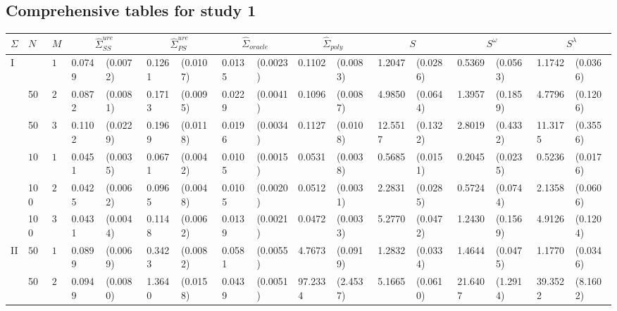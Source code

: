 \subsection{Comprehensive tables for study 1}
\begin{landscape}
%
\begin{table}[H]
\centering
\begin{footnotesize}
\begin{tabular}{lllllllllllllllll}
$\Sigma$ & $N$ & $M$ & \multicolumn{2}{c}{$\hat{\Sigma}^{ure}_{SS}$} &  \multicolumn{2}{c}{$\hat{\Sigma}^{ure}_{PS}$} &  \multicolumn{2}{c}{$\hat{\Sigma}_{oracle}$}   &  \multicolumn{2}{c}{$\hat{\Sigma}_{poly}$}  &  \multicolumn{2}{c}{$S$}   &  \multicolumn{2}{c}{$S^\omega$}   &  \multicolumn{2}{c}{$S^\lambda$}   \\ 
  \hline
I &  & $10$ & 0.0749 & (0.0072) & 0.1261 & (0.0107) & 0.0135 & (0.0023) & 0.1102 & (0.0083) & 1.2047 & (0.0286) & 0.5369 & (0.0563) & 1.1742 & (0.0366) \\ 
    & 50  & $20$ & 0.0872 & (0.0081) & 0.1713 & (0.0095) & 0.0229 & (0.0041) & 0.1096 & (0.0087) & 4.9850 & (0.0644) & 1.3957 & (0.1859) & 4.7796 & (0.1206) \\ 
    &  50 & $30$ & 0.1102 & (0.0229) & 0.1969 & (0.0118) & 0.0196 & (0.0034) & 0.1127 & (0.0108) & 12.5517 & (0.1322) & 2.8019 & (0.4332) & 11.3175 & (0.3556) \\ 
    & $100$ & $10$ & 0.0451 & (0.0035) & 0.0671 & (0.0042) & 0.0105 & (0.0015) & 0.0531 & (0.0038) & 0.5685 & (0.0151) & 0.2045 & (0.0235) & 0.5236 & (0.0176) \\ 
    &  100 & $20$ & 0.0425 & (0.0062) & 0.0965 & (0.0048) & 0.0105 & (0.0020) & 0.0512 & (0.0031) & 2.2831 & (0.0285) & 0.5724 & (0.0744) & 2.1358 & (0.0606) \\ 
    & 100  & $30$ & 0.0431 & (0.0044) & 0.1148 & (0.0062) & 0.0139 & (0.0021) & 0.0472 & (0.0033) & 5.2770 & (0.0472) & 1.2430 & (0.1569) & 4.9126 & (0.1204) \\ 
  II & $50$ & $10$ & 0.0899 & (0.0069) & 0.3423 & (0.0082) & 0.0581 & (0.0055) & 4.7673 & (0.0919) & 1.2832 & (0.0334) & 1.4644 & (0.0475) & 1.1770 & (0.0346) \\ 
    &  50 & $20$ & 0.0949 & (0.0080) & 1.3640 & (0.0158) & 0.0439 & (0.0051) & 97.2334 & (2.4537) & 5.1665 & (0.0610) & 21.6407 & (1.2914) & 39.3522 & (8.1602) \\ 

\end{tabular}
\end{footnotesize}
\end{table}
\end{landscape}
